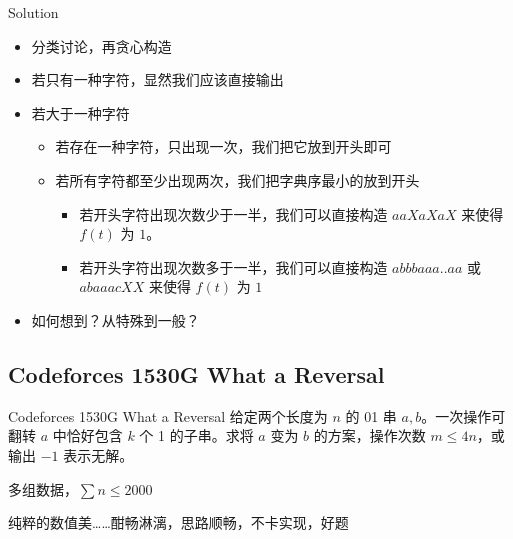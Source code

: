 ﻿\documentclass[aspectratio=169]{ctexbeamer}
\begin{document}
\begin{frame}{Solution}
    \begin{itemize}
        \item 分类讨论，再贪心构造
        \item 若只有一种字符，显然我们应该直接输出
        \item 若大于一种字符
        \begin{itemize}
            \item 若存在一种字符，只出现一次，我们把它放到开头即可
            \item 若所有字符都至少出现两次，我们把字典序最小的放到开头
            \begin{itemize}
                \item 若开头字符出现次数少于一半，我们可以直接构造 $aaXaXaX$ 来使得 $f(t)$ 为 $ 1 $。
                \item 若开头字符出现次数多于一半，我们可以直接构造 $abbbaaa..aa$ 或 $abaaacXX$ 来使得 $f(t)$ 为 $ 1 $
            \end{itemize}
        \end{itemize}
        \item 如何想到？从特殊到一般？
    \end{itemize}
\end{frame}











\subsection{Codeforces 1530G What a Reversal}
\begin{frame}{Codeforces 1530G What a Reversal}
    给定两个长度为 $n$ 的 01 串 $a,b$。一次操作可翻转 $a$ 中恰好包含 $k$ 个 1 的子串。求将 $a$ 变为 $b$ 的方案，操作次数 $m\le 4n$，或输出 $-1$ 表示无解。
    
    多组数据，$\sum n\le 2000$

    纯粹的数值美……酣畅淋漓，思路顺畅，不卡实现，好题
\end{frame}
\end{document}
